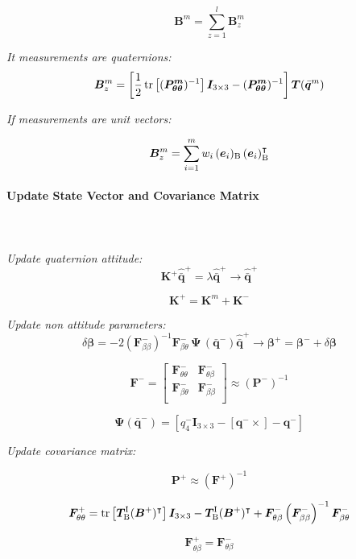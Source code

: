 \documentclass{article}
\begin{document}
$$
  \bm{B}^{m} = \sum_{z=1}^{l}\bm{B}_{z}^{m}
$$

\textit{It measurements are quaternions:}
$$
  \bm{B}^{m}_{z} = \left[\frac{1}{2}\,\textnormal{tr}\left[(\bm{P_{\theta\theta}^{m}})^{-1}\right]\bm{I}_{3\times 3} - (\bm{P_{\theta\theta}^{m}})^{-1}\right]\bm{T}(\bar{\bm{q}}^{m})
$$

\textit{If measurements are unit vectors:}

$$
  \bm{B}^{m}_{z} = \sum^{m}_{i=1}w_{i}\,(\bm{e}_{i})_{\textnormal{B}}\,(\bm{e}_{i})_{\textnormal{B}}^{\intercal}
$$

\paragraph{Update State Vector and Covariance Matrix}\mbox{}\\\\
\textit{Update quaternion attitude:}
$$
  \bm{K}^{+}\hat{\bar{\bm{q}}}^{+} = \lambda\hat{\bar{\bm{q}}}^{+}
  \longrightarrow \hat{\bar{\bm{q}}}^{+}
$$

$$
  \bm{K}^{+} = \bm{K}^{m} + \bm{K}^{-}
$$

\textit{Update non attitude parameters:}
$$
  \delta\bm{\beta} = - 2\left(\bm{F}_{\beta\beta}^{-}\right)^{-1}\bm{F}_{\beta\theta}^{-}\,\bm{\Psi}\,(\bar{\bm{q}}^{-})\hat{\bar{\bm{q}}}^{+}
  \longrightarrow \bm{\beta}^{+} = \bm{\beta}^{-} + \delta\bm{\beta}
$$

$$
\bm{F}^{-} =
  \begin{bmatrix}
    \bm{F}_{\theta\theta}^{-} & \bm{F}_{\theta\beta}^{-} \\
    \bm{F}_{\beta\theta}^{-} & \bm{F}_{\beta\beta}^{-} \\
  \end{bmatrix}
  \approx (\bm{P}^{-})^{-1}
$$

$$
  \bm{\Psi}(\bar{\bm{q}}^{-}) = \left[q_{4}^{-}\bm{I}_{3\times 3} - [\bm{q}^{-}\times] - \bm{q}^{-}\right]
$$

\textit{Update covariance matrix:}

$$
  \bm{P}^{+} \approx \left(\bm{F}^{+}\right)^{-1}
$$

$$
  \bm{F}_{\theta\theta}^{+} = \textnormal{tr}\left[ \bm{T}^{\textnormal{I}}_{\textnormal{B}} (\bm{B}^{+})^{\intercal} \right]\bm{I}_{3\times 3} - \bm{T}_{\textnormal{B}}^{\textnormal{I}} (\bm{B}^{+})^{\intercal} + \bm{F}_{\theta\beta}^{-}\left( \bm{F}_{\beta\beta}^{-} \right)^{-1} \bm{F}_{\beta\theta}^{-}
$$

$$
  \bm{F}^{+}_{\theta\beta} =  \bm{F}^{-}_{\theta\beta}
$$
\end{document}

